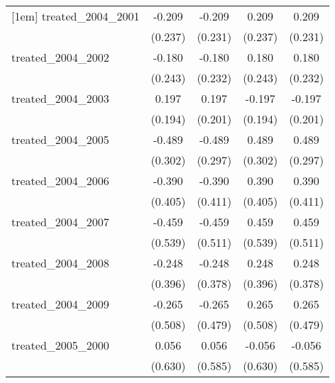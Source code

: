 {\begin{tabular}{l*{4}{c}}
[1em]
treated\_2004\_2001&      -0.209         &      -0.209         &       0.209         &       0.209         \\
            &     (0.237)         &     (0.231)         &     (0.237)         &     (0.231)         \\
[1em]
treated\_2004\_2002&      -0.180         &      -0.180         &       0.180         &       0.180         \\
            &     (0.243)         &     (0.232)         &     (0.243)         &     (0.232)         \\
[1em]
treated\_2004\_2003&       0.197         &       0.197         &      -0.197         &      -0.197         \\
            &     (0.194)         &     (0.201)         &     (0.194)         &     (0.201)         \\
[1em]
treated\_2004\_2005&      -0.489         &      -0.489         &       0.489         &       0.489         \\
            &     (0.302)         &     (0.297)         &     (0.302)         &     (0.297)         \\
[1em]
treated\_2004\_2006&      -0.390         &      -0.390         &       0.390         &       0.390         \\
            &     (0.405)         &     (0.411)         &     (0.405)         &     (0.411)         \\
[1em]
treated\_2004\_2007&      -0.459         &      -0.459         &       0.459         &       0.459         \\
            &     (0.539)         &     (0.511)         &     (0.539)         &     (0.511)         \\
[1em]
treated\_2004\_2008&      -0.248         &      -0.248         &       0.248         &       0.248         \\
            &     (0.396)         &     (0.378)         &     (0.396)         &     (0.378)         \\
[1em]
treated\_2004\_2009&      -0.265         &      -0.265         &       0.265         &       0.265         \\
            &     (0.508)         &     (0.479)         &     (0.508)         &     (0.479)         \\
[1em]
treated\_2005\_2000&       0.056         &       0.056         &      -0.056         &      -0.056         \\
            &     (0.630)         &     (0.585)         &     (0.630)         &     (0.585)         \\

\end{tabular}}
